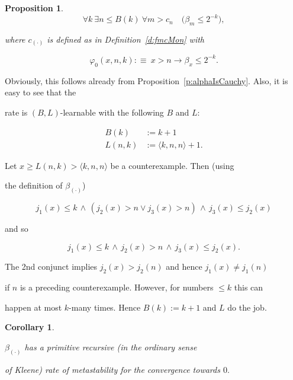 \documentclass[1p]{elsarticle}
\theoremstyle{plain}
\newtheorem{prop}[thm]{Proposition}
\newtheorem{cor}[thm]{Corollary}
\theoremstyle{definition}
\theoremstyle{remark}
\renewenvironment{proof}[1][]{\noindent{\bf Proof{#1}. }}{\nopagebreak[4]{\hspace*{\fill}


  $\Box$              %

 }{\vspace{2ex}}}
\renewcommand{\phi}{\varphi}
\theoremstyle{definition}
\begin{document}
{\begin{prop}
\[ \forall k\ \exists n\leq B(k)\ \forall m > c_n\quad \big(\beta_m\leq 2^{-k}\big),\]

where $c_{(\cdot)}$ is defined as in Definition~\ref{d:fmcMon} with

\[

\phi_0(x,n,k):\equiv\ x> n\rightarrow \beta_x\le 2^{-k}.

\]

\end{prop}

\begin{proof}

Obviously, this follows already from Proposition~\ref{p:alphaIsCauchy}. Also, it is easy to see that the 

rate is $(B,L)$-learnable with the following $B$ and $L$:

\begin{align*}

B(k)&:=k+1  \\

L(n,k)&:= \langle k,n,n \rangle+1.

\end{align*}

Let $x\ge L(n,k)>\langle k,n,n\rangle$ be a counterexample. Then (using 

the definition of $\beta_{(\cdot)}$)  

\[ j_1(x)\le k\,\wedge\,(j_2(x)>n\vee j_3(x)>n)\,\wedge \,j_3(x)\le j_2(x) \] 

and so 

\[ j_1(x)\le k\,\wedge\,j_2(x)>n\,\wedge\,j_3(x)\le j_2(x). \]

The 2nd conjunct implies $j_2(x)>j_2(n)$ and hence $j_1(x)\not= j_1(n)$ 

if $n$ is a preceding counterexample. However, for numbers $\le k$ this can 

happen at most $k$-many times. Hence $B(k):=k+1$ and $L$ do the job.

\end{proof}





\begin{cor} \label{metastability-alpha}

$\beta_{(\cdot)}$ has a primitive recursive (in the ordinary sense 

of Kleene) rate of metastability for the convergence towards $0.$

\end{cor}

}
\end{document}
